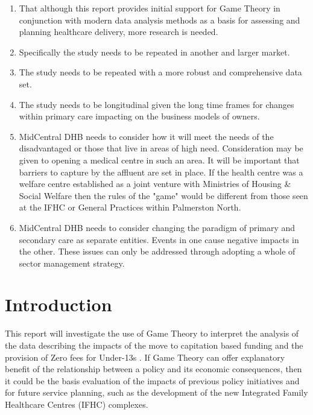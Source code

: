 \documentclass[11pt,a4paper]{article}
\begin{document}
\begin{enumerate}
\item That although this report provides initial support for Game Theory in conjunction with modern data analysis methods as a basis for assessing and planning healthcare delivery, more research is needed.
\item Specifically the study needs to be repeated in another and larger market.
\item The study needs to be repeated with a more robust and comprehensive data set.
\item The study needs to be longitudinal given the long time frames for changes within primary care impacting on the business models of owners.
\item MidCentral DHB needs to consider how it will meet the needs of the disadvantaged or those that live in areas of high need. Consideration may be given to opening a medical centre in such an area. It will be important that barriers to capture by the affluent are set in place. If the health centre was a welfare centre established as a joint venture with Ministries of Housing \& Social Welfare then the rules of the "game" would be different from those seen at the IFHC or General Practices within Palmerston North.
\item MidCentral DHB needs to consider changing the paradigm of primary and secondary care as separate entities. Events in one cause negative impacts in the other. These issues can only be addressed through adopting a whole of sector management strategy. 
\end{enumerate}
\pagebreak


\tableofcontents


\pagebreak
\pagebreak


\listoffigures


\pagebreak
\section{Introduction}
This report will investigate the use of Game Theory to interpret the analysis of the data describing the impacts of the move to capitation based funding \citep{king2001primary} and the provision of  Zero fees for Under-13s \citep{frizelle2014health}. If Game Theory can offer explanatory benefit of the relationship between a policy and its economic consequences, then it could be the basis evaluation of the impacts of previous policy initiatives and for future service planning, such as the development of the new Integrated Family Healthcare Centres (IFHC) complexes.\\ 
\end{document}
